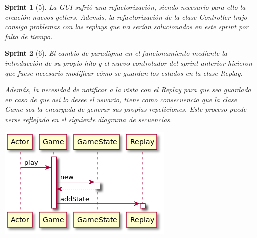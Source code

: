 \documentclass{article}
\theoremstyle{break}
\newtheorem*{sprint}{Sprint}
\begin{document}
\begin{sprint}[5]
La GUI sufrió una refactorización, siendo necesario para ello la creación nuevos getters. Además, la refactorización  de la clase \textit{Controller} trajo consigo problemas con las \textit{replays} que no serían solucionados en este sprint por falta de tiempo.
\end{sprint}

\begin{sprint}[6]
El cambio de paradigma en el funcionamiento mediante la introducción de su propio hilo y el nuevo controlador del sprint anterior hicieron que fuese necesario modificar cómo se guardan los estados en la clase \textit{Replay}.

Además, la necesidad de notificar a la vista con el Replay para que sea guardada en caso de que así lo desee el usuario, tiene como consecuencia que la clase \textit{Game} sea la encargada de generar sus propias repeticiones. Este proceso puede verse reflejado en el siguiente diagrama de secuencias.
\begin{center}
\includegraphics[scale=0.5]{addState-replay-sprint-6.png}
\end{center}

\end{sprint}
\end{document}
